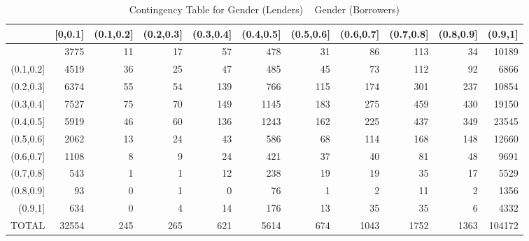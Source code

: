 \begin{table}[!htb]
\centering
\begin{tabular}{rrrrrrrrrrr}
  \hline
 & [0,0.1] & (0.1,0.2] & (0.2,0.3] & (0.3,0.4] & (0.4,0.5] & (0.5,0.6] & (0.6,0.7] & (0.7,0.8] & (0.8,0.9] & (0.9,1] \\ 
  \hline
[0,0.1] & 3775 & 11 & 17 & 57 & 478 & 31 & 86 & 113 & 34 & 10189 \\ 
  (0.1,0.2] & 4519 & 36 & 25 & 47 & 485 & 45 & 73 & 112 & 92 & 6866 \\ 
  (0.2,0.3] & 6374 & 55 & 54 & 139 & 766 & 115 & 174 & 301 & 237 & 10854 \\ 
  (0.3,0.4] & 7527 & 75 & 70 & 149 & 1145 & 183 & 275 & 459 & 430 & 19150 \\ 
  (0.4,0.5] & 5919 & 46 & 60 & 136 & 1243 & 162 & 225 & 437 & 349 & 23545 \\ 
  (0.5,0.6] & 2062 & 13 & 24 & 43 & 586 & 68 & 114 & 168 & 148 & 12660 \\ 
  (0.6,0.7] & 1108 & 8 & 9 & 24 & 421 & 37 & 40 & 81 & 48 & 9691 \\ 
  (0.7,0.8] & 543 & 1 & 1 & 12 & 238 & 19 & 19 & 35 & 17 & 5529 \\ 
  (0.8,0.9] & 93 & 0 & 1 & 0 & 76 & 1 & 2 & 11 & 2 & 1356 \\ 
  (0.9,1] & 634 & 0 & 4 & 14 & 176 & 13 & 35 & 35 & 6 & 4332 \\ 
  TOTAL & 32554 & 245 & 265 & 621 & 5614 & 674 & 1043 & 1752 & 1363 & 104172 \\ 
   \hline
\end{tabular}
\caption{Contingency Table for Gender (Lenders) ~ Gender (Borrowers)} 
\label{tab:contingency_Gender}
\end{table}
